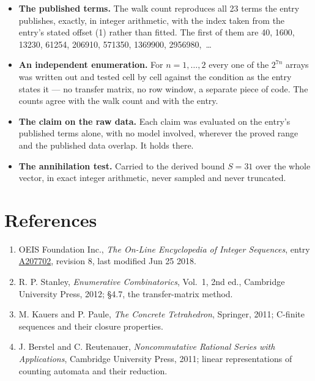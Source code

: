 \documentclass[11pt]{article}
\theoremstyle{definition}
\begin{document}
\begin{itemize}

\item {\bfseries The published terms.} The walk count reproduces all 23 terms the entry publishes, exactly, in integer arithmetic, with the index taken from the entry's stated offset (1) rather than fitted. The first of them are 40, 1600, 13230, 61254, 206910, 571350, 1369900, 2956980,~\dots

\item {\bfseries An independent enumeration.} For $n = 1,\dots,2$ every one of the $2^{7n}$ arrays was written out and tested cell by cell against the condition as the entry states it --- no transfer matrix, no row window, a separate piece of code. The counts agree with the walk count and with the entry.

\item {\bfseries The claim on the raw data.} Each claim was evaluated on the entry's published terms alone, with no model involved, wherever the proved range and the published data overlap. It holds there.

\item {\bfseries The annihilation test.} Carried to the derived bound $S = 31$ over the whole vector, in exact integer arithmetic, never sampled and never truncated.

\end{itemize}

\section{References}

\begin{enumerate}

\item OEIS Foundation Inc., \emph{The On-Line Encyclopedia of Integer Sequences}, entry \href{https://oeis.org/A207702}{A207702}, revision 8, last modified Jun 25 2018.

\item R. P. Stanley, \emph{Enumerative Combinatorics}, Vol.~1, 2nd ed., Cambridge University Press, 2012; \S4.7, the transfer-matrix method.

\item M. Kauers and P. Paule, \emph{The Concrete Tetrahedron}, Springer, 2011; C-finite sequences and their closure properties.

\item J. Berstel and C. Reutenauer, \emph{Noncommutative Rational Series with Applications}, Cambridge University Press, 2011; linear representations of counting automata and their reduction.

\end{enumerate}
\end{document}
